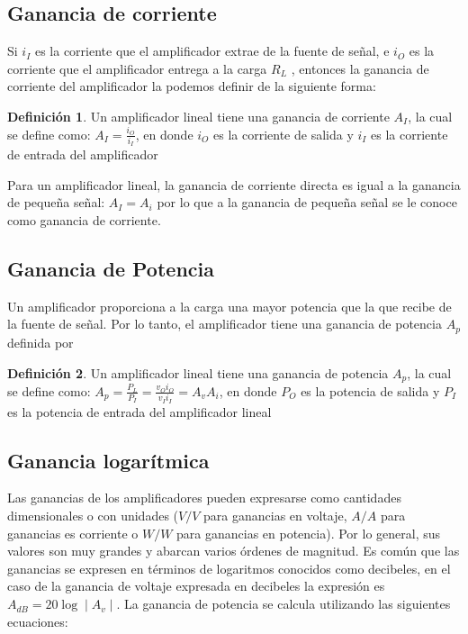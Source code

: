 \documentclass[12pt]{book}
\theoremstyle{definition}
\newtheorem{dfn}{Definición}[section]
\theoremstyle{remark}
\theoremstyle{plain}
\begin{document}
\subsection{Ganancia de corriente}
Si  $i_I$ es la corriente que el amplificador extrae de la fuente de señal, e   $i_O$ es la corriente que el amplificador entrega a la carga $R_L$ , entonces la ganancia de corriente   del amplificador la podemos definir de la siguiente forma:

\begin{dfn}
\label{def2}
Un amplificador lineal tiene una ganancia de corriente $A_I$, la cual se define como:
$
A_I=\frac{i_O}{i_I}
$,
en donde $i_O$ es la corriente de salida y $i_I$ es la corriente de entrada del amplificador
\end{dfn}

Para un amplificador lineal, la ganancia de corriente directa es igual a la ganancia de pequeña señal:  $A_I=A_i$  por lo que a la ganancia de pequeña señal se le conoce como ganancia de corriente.

\subsection{Ganancia de Potencia}

Un amplificador proporciona a la carga una mayor potencia que la que recibe de la fuente de señal. Por lo tanto, el amplificador tiene una ganancia de potencia  $A_p$  definida por

\begin{dfn}
\label{def3}
Un amplificador lineal tiene una ganancia de potencia $A_p$, la cual se define como:
$
A_p=\frac{P_L}{P_I} =\frac{v_O i_O}{v_I i_I}=A_v A_i
$,
en donde $P_O$ es la potencia de salida y $P_I$ es la potencia de entrada del amplificador lineal
\end{dfn}

\subsection{Ganancia logarítmica}
Las ganancias de los amplificadores pueden expresarse como cantidades dimensionales o con unidades ($V/V$  para ganancias en voltaje, $A/A$ para ganancias es corriente o $W/W$ para ganancias en potencia). Por lo general, sus valores son muy grandes y abarcan varios órdenes de magnitud. Es común que las ganancias se expresen en términos de logaritmos conocidos como decibeles, en el caso de la ganancia de voltaje expresada en decibeles la expresión es $A_{dB}=20 \log \mid A_v \mid$.
La ganancia de potencia se calcula utilizando las siguientes ecuaciones:
\end{document}
